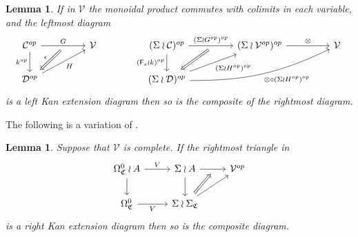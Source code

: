 \documentclass[a4paper,10pt
,draft
]{article}%
\numberwithin{equation}{section}
\numberwithin{figure}{section}
\newtheorem{lemma}[equation]{Lemma}%
\theoremstyle{definition} %
\newcommand{\Fin}{\mathsf{F}}%
\newcommand{\1}{\ensuremath{\mathbbm 1}}%
\begin{document}
\begin{lemma}\label{FINWRPRODLIM LEM}
If in $\mathcal{V}$
the monoidal product %
commutes with colimits in each variable, and the leftmost diagram
\begin{equation}\label{WRLAN EQ}
	\begin{tikzcd}[column sep = 4.5em]
	\mathcal{C}^{op} \ar{r}[swap,name=F]{}{G} \ar{d}[swap]{k^{op}} & 
	\mathcal{V} & 
	(\Sigma \wr \mathcal{C})^{op} \ar{d}[swap]{(\Fin_s \wr k)^{op}} 
	\ar{r}[swap,name=FF]{}{(\Sigma \wr G^{op})^{op}} & 
	(\Sigma \wr \mathcal{V}^{op})^{op} \ar{r}{\otimes} &
	\mathcal{V}
\\
	|[alias=D]|\mathcal{D}^{op} \ar{ru}[swap]{H} &
	& 
	|[alias=FD]|(\Sigma \wr \mathcal{D})^{op} 
	\ar{ru}[swap]{(\Sigma \wr H^{op})^{op}}
	\ar[bend right=13]{rru}[swap]{\otimes \circ (\Sigma \wr H^{op})^{op}}
	&
	\arrow[Leftarrow, from=D, to=F,shorten <=0.10cm,"\epsilon"]
	\arrow[Leftarrow, from=FD, to=FF,shorten <=0.10cm]
	\end{tikzcd}
\end{equation}
is a left Kan extension diagram then so is the composite of the rightmost diagram. 
\end{lemma}


The following is a variation of \cite[Lemma 4.28]{BP_geo}.
\begin{lemma}\label{LANPULLCOMA LEM}
	Suppose that $\mathcal{V}$ is complete. If the rightmost triangle in 
\[
\begin{tikzcd}
	\Omega_{\mathfrak{C}}^{0} \wr A \ar{r}{V} 
	\ar{d} & 
	\Sigma \wr A  
	\ar{d}  \ar{r}[swap,name=F]{}&
	\mathcal{V}^{op}
\\
	\Omega_{\mathfrak{C}}^{0} \ar{r}[swap]{V} & 
	|[alias=FEG]|\Sigma \wr \Sigma_{\mathfrak{C}} \ar{ru}
\arrow[Rightarrow, from=FEG, to=F,shorten <=0.15cm]
\end{tikzcd}
\]
is a right Kan extension diagram then so is the composite diagram.
\end{lemma}
\end{document}
